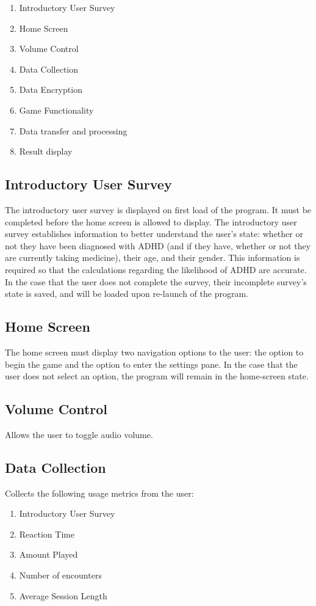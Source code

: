 \documentclass[a4wide]{article}
\begin{document}
\begin{enumerate}
\item Introductory User Survey
\item Home Screen
\item Volume Control
\item Data Collection
\item Data Encryption
\item Game Functionality
\item Data transfer and processing
\item Result display
\end{enumerate}


\subsection{Introductory User Survey}
The introductory user survey is displayed on first load of the program. It must be completed before the home screen is allowed to display. The introductory user survey establishes information to better understand the user's state: whether or not they have been diagnosed with ADHD (and if they have, whether or not they are currently taking medicine), their age, and their gender. This information is required so that the calculations regarding the likelihood of ADHD are accurate. In the case that the user does not complete the survey, their incomplete survey's state is saved, and will be loaded upon re-launch of the program.

\subsection{Home Screen}
The home screen must display two navigation options to the user: the option to begin the game and the option to enter the settings pane. In the case that the user does not select an option, the program will remain in the home-screen state.

\subsection{Volume Control}
Allows the user to toggle audio volume.

\subsection{Data Collection}
Collects the following usage metrics from the user:
\begin{enumerate}
\item Introductory User Survey
\item Reaction Time
\item Amount Played
\item Number of encounters
\item Average Session Length
\end{enumerate}
\end{document}
